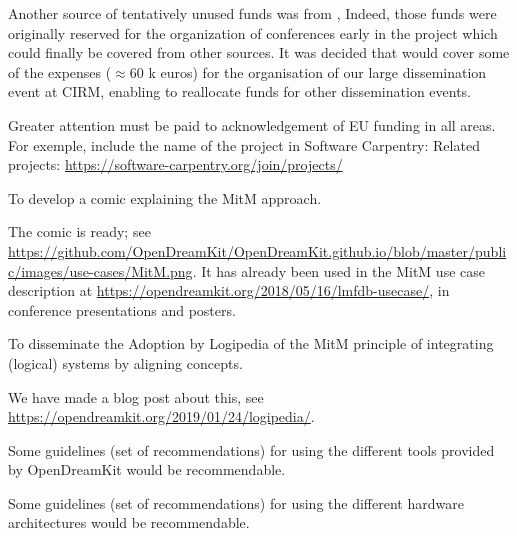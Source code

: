 Another source of tentatively unused funds was from ,
Indeed, those funds were originally reserved for the organization of
conferences early in the project which could finally be covered from
other sources. It was decided that  would cover some of
the expenses ($\approx$60 k euros) for the organisation of our large
dissemination event at CIRM, enabling  to reallocate funds
for other dissemination events.

\begin{recommendation}
  Greater attention must be paid to acknowledgement of EU funding in
  all areas. For exemple, include the name of the project in Software
  Carpentry: Related projects:
  \url{https://software-carpentry.org/join/projects/}
\end{recommendation}

\begin{recommendation}
  To develop a comic explaining the MitM approach.
\end{recommendation}
The comic is ready; see
\url{https://github.com/OpenDreamKit/OpenDreamKit.github.io/blob/master/public/images/use-cases/MitM.png}. It
has already been used in the MitM use case description at
\url{https://opendreamkit.org/2018/05/16/lmfdb-usecase/}, in conference presentations and
posters.  

\begin{recommendation}
  To disseminate the Adoption by Logipedia of the MitM principle of
  integrating (logical) systems by aligning concepts.
\end{recommendation}
We have made a blog post about this, see \url{https://opendreamkit.org/2019/01/24/logipedia/}.

\begin{recommendation}
  Some guidelines (set of recommendations) for using the different
  tools provided by OpenDreamKit would be recommendable.
\end{recommendation}

\begin{recommendation}
  Some guidelines (set of recommendations) for using the different
  hardware architectures would be recommendable.
\end{recommendation}



